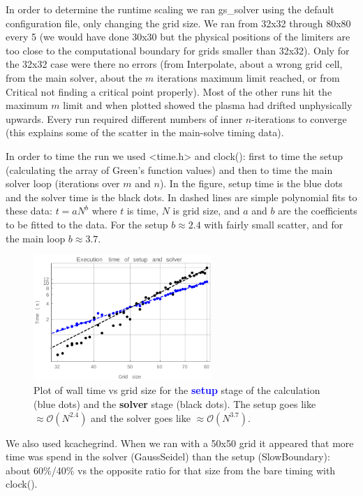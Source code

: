 \documentclass[paper=letter, fontsize=11pt]{scrartcl} %
\begin{document}
In order to determine the runtime scaling we ran gs\_solver using the default configuration file, only changing the grid size. We ran from 32x32 through 80x80 every 5 (we would have done 30x30 but the physical positions of the limiters are too close to the computational boundary for grids smaller than 32x32). Only for the 32x32 case were there no errors (from Interpolate, about a wrong grid cell, from the main solver, about the $m$ iterations maximum limit reached, or from Critical not finding a critical point properly). Most of the other runs hit the maximum $m$ limit and when plotted showed the plasma had drifted unphysically upwards. Every run required different numbers of inner $n$-iterations to converge (this explains some of the scatter in the main-solve timing data).

In order to time the run we used <time.h> and clock(): first to time the setup (calculating the array of Green's function values) and then to time the main solver loop (iterations over $m$ and $n$). In the figure, setup time is the blue dots and the solver time is the black dots. In dashed lines are simple polynomial fits to these data: $t = a N^b$ where $t$ is time, $N$ is grid size, and $a$ and $b$ are the coefficients to be fitted to the data. For the setup $b \approx 2.4$ with fairly small scatter, and for the main loop $b \approx 3.7$.

\begin{figure}
	\centering
	\includegraphics[width=0.6\textwidth]{run_times.pdf}
	\caption{Plot of wall time vs grid size for the \textcolor{blue}{\textbf{setup}} stage of the calculation (blue dots) and the \textbf{solver} stage (black dots).  The setup goes like $\approx \mathcal{O}(N^{2.4})$ and the solver goes like $\approx \mathcal{O}(N^{3.7})$.}
\end{figure}

We also used kcachegrind. When we ran with a 50x50 grid it appeared that more time was spend in the solver (GaussSeidel) than the setup (SlowBoundary): about 60\%/40\% vs the opposite ratio for that size from the bare timing with clock(). 
\end{document}
